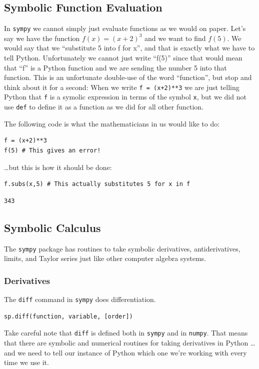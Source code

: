 \subsection{Symbolic Function Evaluation}
In \texttt{sympy} we cannot simply just evaluate functions as we would on paper.  Let's
say we have the function $f(x)= (x+2)^3$ and we want to find $f(5)$.  We would say that we
``substitute 5 into f for x'', and that is exactly what we have to tell Python.
Unfortunately we cannot just write ``f(5)'' since that would mean that ``f'' is a Python
function and we are sending the number 5 into that function.  This is an unfortunate
double-use of the word ``function'', but stop and think about it for a second: When we
write \texttt{f = (x+2)**3} we are just telling Python that \texttt{f} is a symolic
expression in terms of the symbol \texttt{x}, but we did not use \texttt{def} to define it
as a function as we did for all other function.

The following code is what the mathematicians in us would like to do:
\bcode
\begin{lstlisting}
f = (x+2)**3
f(5) # This gives an error!
\end{lstlisting}

\ldots but this is how it should be done:
\bcode
\begin{lstlisting}
f.subs(x,5) # This actually substitutes 5 for x in f
\end{lstlisting}
\boutput
\begin{lstlisting}
343
\end{lstlisting}


\subsection{Symbolic Calculus}
The \texttt{sympy} package has routines to take symbolic derivatives, antiderivatives,
limits, and Taylor series just like other computer algebra systems.  

\subsubsection{Derivatives}
The \texttt{diff} command in \texttt{sympy} does differentiation.
\begin{lstlisting}
sp.diff(function, variable, [order])
\end{lstlisting}
Take careful note that \texttt{diff} is defined both in \texttt{sympy} and in
\texttt{numpy}.  That means that there are symbolic and numerical routines for taking
derivatives in Python \ldots and we need to tell our instance of Python which one we're working with every time we use it.  

